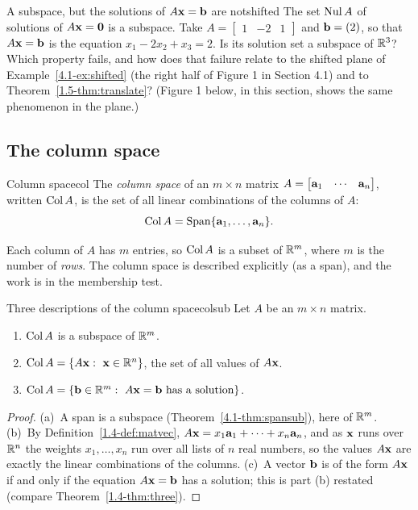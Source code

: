 \documentclass[11pt]{article}
\begin{document}
\begin{think}{A subspace, but the solutions of $A\mathbf{x}=\mathbf{b}$ are not}{shifted}
The set $\operatorname{Nul} A$ of solutions of $A\mathbf{x}=\mathbf{0}$ is a subspace. Take $A=\begin{bmatrix}1&-2&1\end{bmatrix}$ and $\mathbf{b}=(2)$, so that $A\mathbf{x}=\mathbf{b}$ is the equation $x_1-2x_2+x_3=2$. Is its solution set a subspace of $\mathbb{R}^3$? Which property fails, and how does that failure relate to the shifted plane of Example~\ref{4.1-ex:shifted} (the right half of Figure 1 in Section 4.1) and to Theorem~\ref{1.5-thm:translate}? (Figure 1 below, in this section, shows the same phenomenon in the plane.)
\end{think}

\subsection*{The column space}

\begin{defn}{Column space}{col}
The \emph{column space} of an $m\times n$ matrix $A=\begin{bmatrix}\mathbf{a}_1&\cdots&\mathbf{a}_n\end{bmatrix}$, written $\operatorname{Col} A$, is the set of all linear combinations of the columns of $A$:
\[
\operatorname{Col} A=\operatorname{Span}\{\mathbf{a}_1,\dots,\mathbf{a}_n\}.
\]
\end{defn}

Each column of $A$ has $m$ entries, so $\operatorname{Col} A$ is a subset of $\mathbb{R}^m$, where $m$ is the number of \emph{rows}. The column space is described explicitly (as a span), and the work is in the membership test.

\begin{thm}{Three descriptions of the column space}{colsub}
Let $A$ be an $m\times n$ matrix.
\begin{enumerate}[label=(\alph*),itemsep=1pt]
  \item $\operatorname{Col} A$ is a subspace of $\mathbb{R}^m$.
  \item $\Col A=\{A\bv{x}:\ \bv{x}\in\R^n\}$, the set of all values of $A\mathbf{x}$.
  \item $\Col A=\{\bv{b}\in\R^m:\ A\bv{x}=\bv{b}\text{ has a solution}\}$.
\end{enumerate}
\end{thm}

\begin{proof}
(a)~A span is a subspace (Theorem~\ref{4.1-thm:spansub}), here of $\mathbb{R}^m$. (b)~By Definition~\ref{1.4-def:matvec}, $A\mathbf{x}=x_1\mathbf{a}_1+\cdots+x_n\mathbf{a}_n$, and as $\mathbf{x}$ runs over $\mathbb{R}^n$ the weights $x_1,\dots,x_n$ run over all lists of $n$ real numbers, so the values $A\mathbf{x}$ are exactly the linear combinations of the columns. (c)~A vector $\mathbf{b}$ is of the form $A\mathbf{x}$ if and only if the equation $A\mathbf{x}=\mathbf{b}$ has a solution; this is part (b) restated (compare Theorem~\ref{1.4-thm:three}).
\end{proof}
\end{document}
